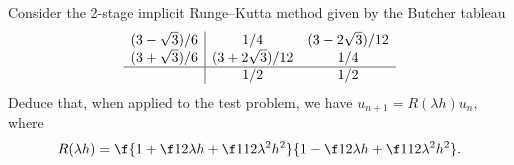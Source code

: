 \documentclass[a4paper]{article}
\begin{document}


\begin{questionbody}
Consider the 2-stage implicit Runge--Kutta method given by the Butcher tableau \[ %
\begin{array}{c|cc} %
(3 - \sqrt 3) / 6 & 1/4 & (3 - 2 \sqrt 3) / 12 \\
(3 + \sqrt 3) / 6 & (3 + 2 \sqrt 3) / 12 & 1/4 \\
\hline %
& 1/2 & 1/2
\end{array}
\] Deduce that, when applied to the test problem, we have $u_{n+1} = R (\lambda h) u_n$, where \[
R (\lambda h) = \f{1 + \f12 \lambda h + \f1{12} \lambda^2 h^2}{1 - \f12 \lambda h + \f1{12} \lambda^2 h^2}.
\]
\end{questionbody}
\end{document}
